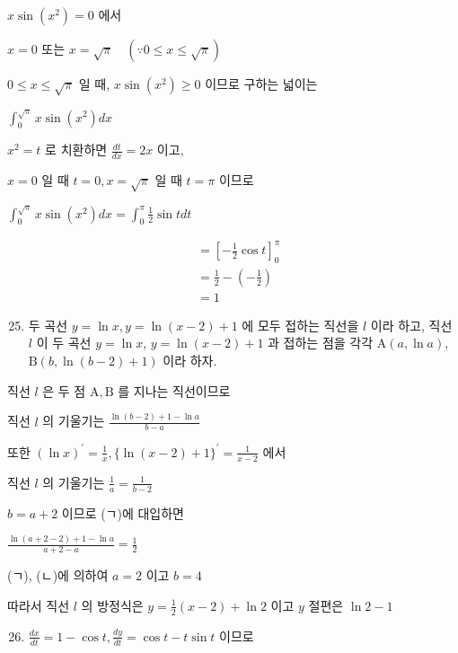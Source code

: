 \documentclass[10pt]{article}
\begin{document}
\(x \sin \left(x^{2}\right)=0\) 에서

\(x=0\) 또는 \(x=\sqrt{\pi} \quad(\because 0 \leq x \leq \sqrt{\pi})\)

\(0 \leq x \leq \sqrt{\pi}\) 일 때, \(x \sin \left(x^{2}\right) \geq 0\) 이므로 구하는 넓이는

\(\int_{0}^{\sqrt{\pi}} x \sin \left(x^{2}\right) d x\)

\(x^{2}=t\) 로 치환하면 \(\frac{d t}{d x}=2 x\) 이고,

\(x=0\) 일 때 \(t=0, x=\sqrt{\pi}\) 일 때 \(t=\pi\) 이므로

\(\int_{0}^{\sqrt{\pi}} x \sin \left(x^{2}\right) d x=\int_{0}^{\pi} \frac{1}{2} \sin t d t\)

\[
\begin{aligned}
& =\left[-\frac{1}{2} \cos t\right]_{0}^{\pi} \\
& =\frac{1}{2}-\left(-\frac{1}{2}\right) \\
& =1
\end{aligned}
\]

\begin{enumerate}
  \setcounter{enumi}{24}
  \item 두 곡선 \(y=\ln x, y=\ln (x-2)+1\) 에 모두 접하는 직선을 \(l\) 이라 하고, 직선 \(l\) 이 두 곡선 \(y=\ln x\), \(y=\ln (x-2)+1\) 과 접하는 점을 각각 \(\mathrm{A}(a, \ln a)\), \(\mathrm{B}(b, \ln (b-2)+1)\) 이라 하자.
\end{enumerate}

직선 \(l\) 은 두 점 \(\mathrm{A}, \mathrm{B}\) 를 지나는 직선이므로

직선 \(l\) 의 기울기는 \(\frac{\ln (b-2)+1-\ln a}{b-a}\)

또한 \((\ln x)^{\prime}=\frac{1}{x},\{\ln (x-2)+1\}^{\prime}=\frac{1}{x-2}\) 에서

직선 \(l\) 의 기울기는 \(\frac{1}{a}=\frac{1}{b-2}\)

\(b=a+2\) 이므로 (ㄱ)에 대입하면

\(\frac{\ln (a+2-2)+1-\ln a}{a+2-a}=\frac{1}{2}\)

(ㄱ), (ㄴ)에 의하여 \(a=2\) 이고 \(b=4\)

따라서 직선 \(l\) 의 방정식은 \(y=\frac{1}{2}(x-2)+\ln 2\) 이고 \(y\) 절편은 \(\ln 2-1\)

\begin{enumerate}
  \setcounter{enumi}{25}
  \item \(\frac{d x}{d t}=1-\cos t, \frac{d y}{d t}=\cos t-t \sin t\) 이므로
\end{enumerate}
\end{document}
